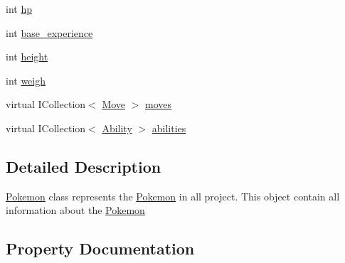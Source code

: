\begin{DoxyCompactItemize}
int \mbox{\hyperlink{class_poke_web_1_1_models_1_1_pokemon_a122936a5bf25b4f565012b7daff5e577}{hp}}
\item 
int \mbox{\hyperlink{class_poke_web_1_1_models_1_1_pokemon_ac5434e65eceb31787ee551c31f4a24ce}{base\+\_\+experience}}
\item 
int \mbox{\hyperlink{class_poke_web_1_1_models_1_1_pokemon_a451a02460c6c35837e8d3994533e2f17}{height}}
\item 
int \mbox{\hyperlink{class_poke_web_1_1_models_1_1_pokemon_ac0f8886171f4dc0ccab04017831f8942}{weigh}}
\item 
virtual I\+Collection$<$ \mbox{\hyperlink{class_poke_web_1_1_models_1_1_move}{Move}} $>$ \mbox{\hyperlink{class_poke_web_1_1_models_1_1_pokemon_ad0debd8b8a90cdac3f17f6dd6d001c59}{moves}}
\item 
virtual I\+Collection$<$ \mbox{\hyperlink{class_poke_web_1_1_models_1_1_ability}{Ability}} $>$ \mbox{\hyperlink{class_poke_web_1_1_models_1_1_pokemon_a3bb33ec8bbbe99286112d6f32c3cc96b}{abilities}}
\end{DoxyCompactItemize}


\subsection{Detailed Description}
\mbox{\hyperlink{class_poke_web_1_1_models_1_1_pokemon}{Pokemon}} class represents the \mbox{\hyperlink{class_poke_web_1_1_models_1_1_pokemon}{Pokemon}} in all project. This object contain all information about the \mbox{\hyperlink{class_poke_web_1_1_models_1_1_pokemon}{Pokemon}} 

\subsection{Property Documentation}
\mbox{\label{class_poke_web_1_1_models_1_1_pokemon_a3bb33ec8bbbe99286112d6f32c3cc96b}} 
